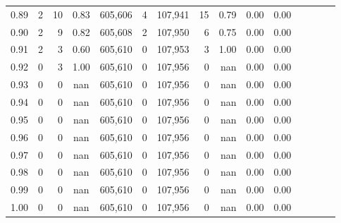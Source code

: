 \begin{tabular}{rrrcrrrrrrrrrrr}
0.89 &       2 &     10 &                                       0.83 &  605,606 &        4 &  107,941 &       15 &  0.79 &  0.00 &                         0.00 \\
0.90 &       2 &      9 &                                       0.82 &  605,608 &        2 &  107,950 &        6 &  0.75 &  0.00 &                         0.00 \\
0.91 &       2 &      3 &                                       0.60 &  605,610 &        0 &  107,953 &        3 &  1.00 &  0.00 &                         0.00 \\
0.92 &       0 &      3 &                                       1.00 &  605,610 &        0 &  107,956 &        0 &   nan &  0.00 &                         0.00 \\
0.93 &       0 &      0 &                                        nan &  605,610 &        0 &  107,956 &        0 &   nan &  0.00 &                         0.00 \\
0.94 &       0 &      0 &                                        nan &  605,610 &        0 &  107,956 &        0 &   nan &  0.00 &                         0.00 \\
0.95 &       0 &      0 &                                        nan &  605,610 &        0 &  107,956 &        0 &   nan &  0.00 &                         0.00 \\
0.96 &       0 &      0 &                                        nan &  605,610 &        0 &  107,956 &        0 &   nan &  0.00 &                         0.00 \\
0.97 &       0 &      0 &                                        nan &  605,610 &        0 &  107,956 &        0 &   nan &  0.00 &                         0.00 \\
0.98 &       0 &      0 &                                        nan &  605,610 &        0 &  107,956 &        0 &   nan &  0.00 &                         0.00 \\
0.99 &       0 &      0 &                                        nan &  605,610 &        0 &  107,956 &        0 &   nan &  0.00 &                         0.00 \\
1.00 &       0 &      0 &                                        nan &  605,610 &        0 &  107,956 &        0 &   nan &  0.00 &                         0.00 \\
\bottomrule
\end{tabular}
